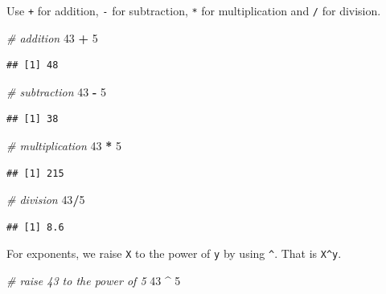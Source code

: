 \documentclass[
]{book}
\newenvironment{Shaded}{\begin{snugshade}}{\end{snugshade}}
\newcommand{\CommentTok}[1]{\textcolor[rgb]{0.56,0.35,0.01}{\textit{#1}}}
\newcommand{\DecValTok}[1]{\textcolor[rgb]{0.00,0.00,0.81}{#1}}
\newcommand{\SpecialCharTok}[1]{\textcolor[rgb]{0.81,0.36,0.00}{\textbf{#1}}}
\begin{document}
Use \texttt{+} for addition, \texttt{-} for subtraction, \texttt{*} for multiplication and \texttt{/} for division.

\begin{Shaded}
\begin{Highlighting}[]
\CommentTok{\# addition}
\DecValTok{43} \SpecialCharTok{+} \DecValTok{5}
\end{Highlighting}
\end{Shaded}

\begin{verbatim}
## [1] 48
\end{verbatim}

\begin{Shaded}
\begin{Highlighting}[]
\CommentTok{\# subtraction}
\DecValTok{43} \SpecialCharTok{{-}} \DecValTok{5}
\end{Highlighting}
\end{Shaded}

\begin{verbatim}
## [1] 38
\end{verbatim}

\begin{Shaded}
\begin{Highlighting}[]
\CommentTok{\# multiplication}
\DecValTok{43} \SpecialCharTok{*} \DecValTok{5}
\end{Highlighting}
\end{Shaded}

\begin{verbatim}
## [1] 215
\end{verbatim}

\begin{Shaded}
\begin{Highlighting}[]
\CommentTok{\# division}
\DecValTok{43}\SpecialCharTok{/}\DecValTok{5}
\end{Highlighting}
\end{Shaded}

\begin{verbatim}
## [1] 8.6
\end{verbatim}

For exponents, we raise \texttt{X} to the power of \texttt{y} by using \texttt{\^{}}. That is \texttt{X\^{}y}.

\begin{Shaded}
\begin{Highlighting}[]
\CommentTok{\# raise 43 to the power of 5}
\DecValTok{43} \SpecialCharTok{\^{}} \DecValTok{5}
\end{Highlighting}
\end{Shaded}
\end{document}
